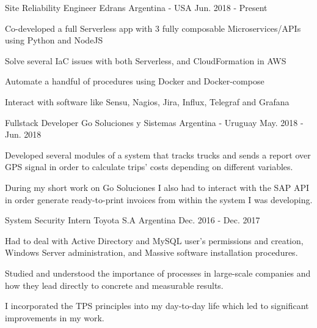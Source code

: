 

\begin{cventries}
\cventry
{Site Reliability Engineer} %
{Edrans} %
{Argentina - USA} %
{Jun. 2018 - Present} %
{
\begin{cvitems} %
\item {Co-developed a full Serverless app with 3 fully composable Microservices/APIs using Python and NodeJS}
\item {Solve several IaC issues with both Serverless, and CloudFormation in AWS}
\item {Automate a handful of procedures using Docker and Docker-compose}
\item{Interact with software like Sensu, Nagios, Jira, Influx, Telegraf and Grafana}
\end{cvitems}
}


\cventry
{Fullstack Developer} %
{Go Soluciones y Sistemas} %
{Argentina - Uruguay} %
{May. 2018 - Jun. 2018} %
{
\begin{cvitems} %
\item {Developed several modules of a system that tracks trucks and sends a report over GPS signal in order to calculate trips' costs depending on different variables.}
\item {During my short work on Go Soluciones I also had to interact with the SAP API in order generate ready-to-print invoices from within the system I was developing.}
\end{cvitems}
}


\cventry
{System Security Intern} %
{Toyota S.A} %
{Argentina} %
{Dec. 2016 - Dec. 2017} %
{
\begin{cvitems} %
\item {Had to deal with Active Directory and MySQL user's permissions and creation, Windows Server administration, and Massive software installation procedures.}
\item {Studied and understood the importance of processes in large-scale companies and how they lead directly to concrete and measurable results.}
\item {I incorporated the TPS principles into my day-to-day life which led to significant improvements in my work.}
\end{cvitems}
}



\end{cventries}
